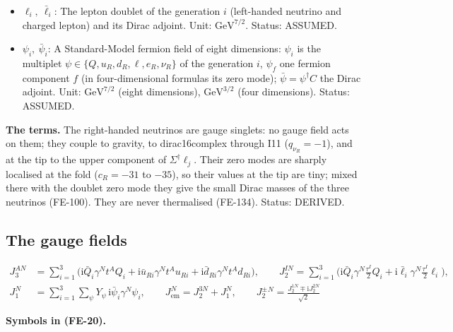 \documentclass[
  10pt,
]{article}
\begin{document}
\begin{itemize}
  transpose of a matrix or spinor (for field operators the adjoint
  operator). Status: STANDARD.
\item
  \(\ell_i,\ \bar\ell_i\): The lepton doublet of the generation \(i\)
  (left-handed neutrino and charged lepton) and its Dirac adjoint. Unit:
  \(\mathrm{GeV}^{7/2}\). Status: ASSUMED.
\item
  \(\psi_i,\ \bar\psi_i\): A Standard-Model fermion field of eight
  dimensions: \(\psi_i\) is the multiplet
  \(\psi \in \{Q, u_R, d_R, \ell, e_R, \nu_R\}\) of the generation
  \(i\), \(\psi_f\) one fermion component \(f\) (in four-dimensional
  formulas its zero mode); \(\bar\psi = \psi^\dagger C\) the Dirac
  adjoint. Unit: \(\mathrm{GeV}^{7/2}\) (eight dimensions),
  \(\mathrm{GeV}^{3/2}\) (four dimensions). Status: ASSUMED.
\end{itemize}

\textbf{The terms.} The right-handed neutrinos are gauge singlets: no
gauge field acts on them; they couple to gravity, to dirac16complex
through I11 (\(q_{\nu_R} = -1\)), and at the tip to the upper component
of \(\Sigma^\dagger\ell_j\). Their zero modes are sharply localised at
the fold (\(c_R = -31\) to \(-35\)), so their values at the tip are
tiny; mixed there with the doublet zero mode they give the small Dirac
masses of the three neutrinos (FE-100). They are never thermalised
(FE-134). Status: DERIVED.

\hypertarget{the-gauge-fields-1}{%
\subsection{The gauge fields}\label{the-gauge-fields-1}}

\[
\begin{aligned}
J_3^{AN} &= \sum_{i=1}^{3}\big(\mathrm{i}\bar Q_i\gamma^Nt^AQ_i + \mathrm{i}\bar u_{Ri}\gamma^Nt^Au_{Ri}
 + \mathrm{i}\bar d_{Ri}\gamma^Nt^Ad_{Ri}\big),\qquad
 J_2^{IN} = \sum_{i=1}^{3}\Big(\mathrm{i}\bar Q_i\gamma^N\frac{\tau^I}{2}Q_i +
 \mathrm{i}\bar\ell_i\gamma^N\frac{\tau^I}{2}\ell_i\Big),\\
J_1^N &= \sum_{i=1}^{3}\sum_\psi Y_\psi\,\mathrm{i}\bar\psi_i\gamma^N\psi_i,\qquad
 J_{\mathrm{em}}^N = J_2^{3N} + J_1^N,\qquad J_2^{\pm}{}^N = \frac{J_2^{1N} \mp \mathrm{i}J_2^{2N}}{\sqrt2}
\end{aligned} \tag{FE-20}
\]

\textbf{Symbols in (FE-20).}
\end{document}
